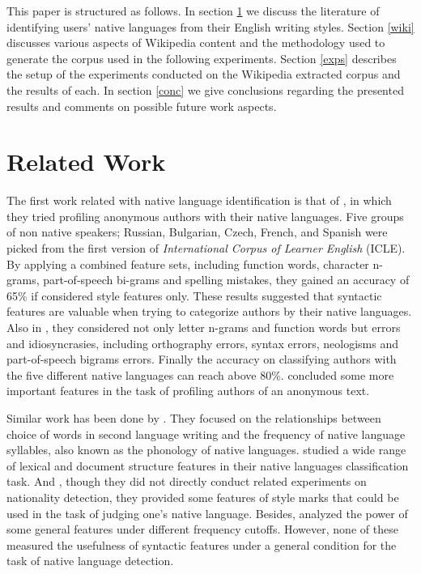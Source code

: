 \documentclass[11pt]{article}
\begin{document}
This paper is structured as follows. In section \ref{rwork} we discuss the
literature of identifying users' native languages from their English writing
styles. Section \ref{wiki} discusses various aspects of Wikipedia content and
the methodology used to generate the corpus used in the following experiments.
Section \ref{exps} describes the setup of the experiments conducted on the
Wikipedia extracted corpus and the results of each. In section \ref{conc} we
give conclusions regarding the presented results and comments on possible future
work aspects. 


\section{Related Work}
\label{rwork}
The first work related with native language identification is that of
\cite{koppel2005automatically}, in which they tried profiling anonymous authors
with their native languages. Five groups of non native speakers; Russian,
Bulgarian, Czech, French, and Spanish were picked from the first version of {\em
International Corpus of Learner English} (ICLE). By applying a combined feature
sets, including function words, character n-grams, part-of-speech bi-grams and
spelling mistakes, they gained an accuracy of 65\% if considered style features
only. These results suggested that syntactic features are valuable when trying
to categorize authors by their native languages. Also in \cite
{koppel2005determining}, they considered not only letter n-grams and function
words but errors and idiosyncrasies, including orthography errors, syntax
errors, neologisms and part-of-speech bigrams errors. Finally the accuracy on
classifying authors with the five different native languages can reach above 80\%.
\cite{argamon2009automatically} concluded some more important features in the task of profiling authors of an anonymous text.

Similar work has been done by \cite {tsur2007using}. They focused on the
relationships between choice of words in second language writing and the
frequency of native language syllables, also known as the phonology of native
languages. \cite {estival2007author} studied a wide range of lexical and
document structure features in their native languages classification task. And
\cite {zheng2003authorship}, though they did not directly conduct related
experiments on nationality detection, they provided some features of style marks
that could be used in the task of judging one's native language. Besides, \cite
{gamon2004linguistic} analyzed the power of some general features under
different frequency cutoffs. However, none of these measured the usefulness of
syntactic features under a general condition for the task of native language
detection.
\end{document}
